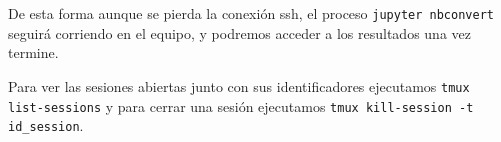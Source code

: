 De esta forma aunque se pierda la conexión ssh, el proceso \texttt{jupyter nbconvert} seguirá corriendo en el equipo, y podremos acceder a los resultados una vez termine. 

Para ver las sesiones abiertas junto con sus identificadores ejecutamos \texttt{tmux list-sessions} y para cerrar una sesión ejecutamos \texttt{tmux kill-session -t id\_session}. 

